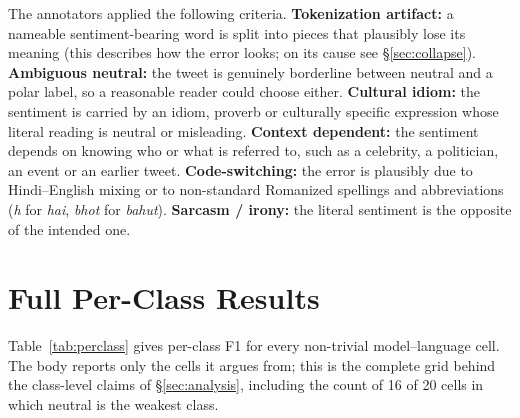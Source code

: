 \documentclass[11pt]{article}
\begin{document}
\noindent The annotators applied the following criteria.
\textbf{Tokenization artifact:} a nameable sentiment-bearing word is split into pieces
that plausibly lose its meaning (this describes how the error looks; on its cause
see \S\ref{sec:collapse}).
\textbf{Ambiguous neutral:} the tweet is genuinely borderline between neutral and a
polar label, so a reasonable reader could choose either.
\textbf{Cultural idiom:} the sentiment is carried by an idiom, proverb or culturally
specific expression whose literal reading is neutral or misleading.
\textbf{Context dependent:} the sentiment depends on knowing who or what is referred to,
such as a celebrity, a politician, an event or an earlier tweet.
\textbf{Code-switching:} the error is plausibly due to Hindi--English mixing or to
non-standard Romanized spellings and abbreviations (\emph{h} for \emph{hai},
\emph{bhot} for \emph{bahut}).
\textbf{Sarcasm / irony:} the literal sentiment is the opposite of the intended one.

\section{Full Per-Class Results}
\label{app:detail}

Table~\ref{tab:perclass} gives per-class F1 for every non-trivial
model--language cell. The body reports only the cells it argues from; this is the
complete grid behind the class-level claims of \S\ref{sec:analysis}, including
the count of 16 of 20 cells in which neutral is the weakest class.
\end{document}
